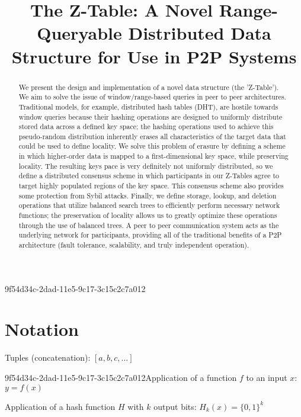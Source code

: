 \documentclass[12pt]{article}
\title{The Z-Table: A Novel Range-Queryable Distributed Data Structure for Use in P2P Systems}
\begin{document}
9f54d34c-2dad-11e5-9c17-3c15c2c7a012
\maketitle

\begin{abstract}
We present the design and implementation of a novel data structure (the 'Z-Table'). We aim to solve the issue of window/range-based queries in peer to peer architectures. Traditional models, for example,  distributed hash tables (DHT), are hostile towards window queries because their hashing operations are designed to uniformly distribute stored data across a defined key space; the hashing operations used to achieve this pseudo-random distribution inherently erases all characteristics of the target data that could be used to define locality. We solve this problem of erasure by defining a scheme in which higher-order data is mapped to a first-dimensional key space, while preserving locality. The resulting keys pace is very definitely not uniformly distributed, so we define a distributed consensus scheme in which participants in our Z-Tables agree to target highly populated regions of the key space. This consensus scheme also provides some protection from Sybil attacks. Finally, we define storage, lookup, and deletion operations that utilize balanced search trees to efficiently perform necessary network functions; the preservation of locality allows us to greatly optimize these operations through the use of balanced trees. A peer to peer communication system acts as the underlying network for participants, providing all of the traditional benefits of a P2P architecture (fault tolerance, scalability, and truly independent operation).
\end{abstract}

\section{Notation}

Tuples (concatenation): $[a,b,c,...]$

9f54d34c-2dad-11e5-9c17-3c15c2c7a012Application of a function $f$ to an input $x$: $y=f(x)$

Application of a hash function $H$ with $k$ output bits: $H_{k}(x) = \{0,1\}^k$
\end{document}
